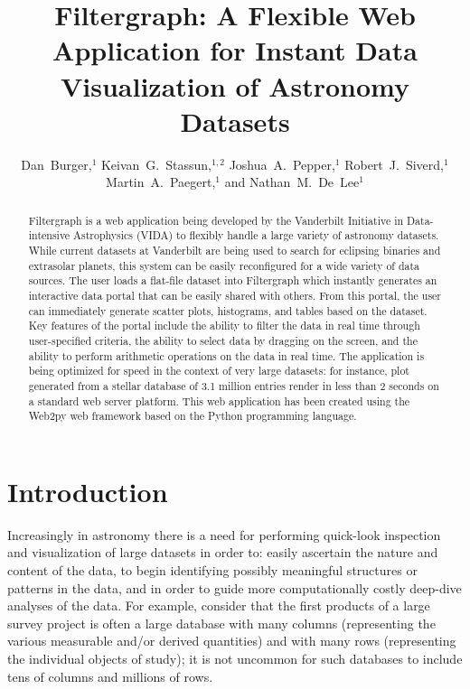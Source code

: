 
\resetcounters




\title{Filtergraph: A Flexible Web Application for Instant Data Visualization of Astronomy Datasets}

\author{Dan~Burger,$^1$ Keivan~G.~Stassun,$^{1,2}$ Joshua~A.~Pepper,$^1$
Robert~J.~Siverd,$^1$ Martin~A.~Paegert,$^1$ and Nathan~M.~De~Lee$^1$
}


\begin{abstract}
Filtergraph is a web application being developed by the Vanderbilt Initiative in Data-intensive Astrophysics (VIDA) to flexibly handle a large variety of astronomy datasets. While current datasets at Vanderbilt are being used to search for eclipsing binaries and extrasolar planets, this system can be easily reconfigured for a wide variety of data sources. The user loads a flat-file dataset into Filtergraph which instantly generates an interactive data portal that can be easily shared with others. From this portal, the user can immediately generate scatter plots, histograms, and tables based on the dataset. Key features of the portal include the ability to filter the data in real time through user-specified criteria, the ability to select data by dragging on the screen, and the ability to perform arithmetic operations on the data in real time. The application is being optimized for speed in the context of very large datasets: for instance, plot generated from a stellar database of 3.1 million entries render in less than 2 seconds on a standard web server platform. This web application has been created using the Web2py web framework based on the Python programming language. 
\end{abstract}

\section{Introduction}
Increasingly in astronomy there is a need for performing quick-look inspection and visualization of large datasets in order to: easily ascertain the nature and content of the data, to begin identifying possibly meaningful structures or patterns in the data, and in order to guide more computationally costly deep-dive analyses of the data. For example, consider that the first products of a large survey project is often a large database with many columns (representing the various measurable and/or derived quantities) and with many rows (representing the individual objects of study); it is not uncommon for such databases to include tens of columns and millions of rows.


